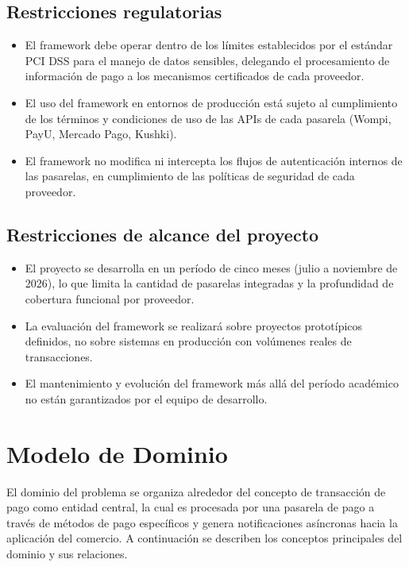 \documentclass[10pt]{article}
\begin{document}
\subsection{Restricciones regulatorias}

\begin{itemize}
  \item El framework debe operar dentro de los límites establecidos por el estándar PCI DSS para el manejo de datos sensibles, delegando el procesamiento de información de pago a los mecanismos certificados de cada proveedor.
  \item El uso del framework en entornos de producción está sujeto al cumplimiento de los términos y condiciones de uso de las APIs de cada pasarela (Wompi, PayU, Mercado Pago, Kushki).
  \item El framework no modifica ni intercepta los flujos de autenticación internos de las pasarelas, en cumplimiento de las políticas de seguridad de cada proveedor.
\end{itemize}

\subsection{Restricciones de alcance del proyecto}

\begin{itemize}
  \item El proyecto se desarrolla en un período de cinco meses (julio a noviembre de 2026), lo que limita la cantidad de pasarelas integradas y la profundidad de cobertura funcional por proveedor.
  \item La evaluación del framework se realizará sobre proyectos prototípicos definidos, no sobre sistemas en producción con volúmenes reales de transacciones.
  \item El mantenimiento y evolución del framework más allá del período académico no están garantizados por el equipo de desarrollo.
\end{itemize}



\section{Modelo de Dominio}

El dominio del problema se organiza alrededor del concepto de transacción de pago como entidad central, la cual es procesada por una pasarela de pago a través de métodos de pago específicos y genera notificaciones asíncronas hacia la aplicación del comercio. A continuación se describen los conceptos principales del dominio y sus relaciones.
\end{document}
